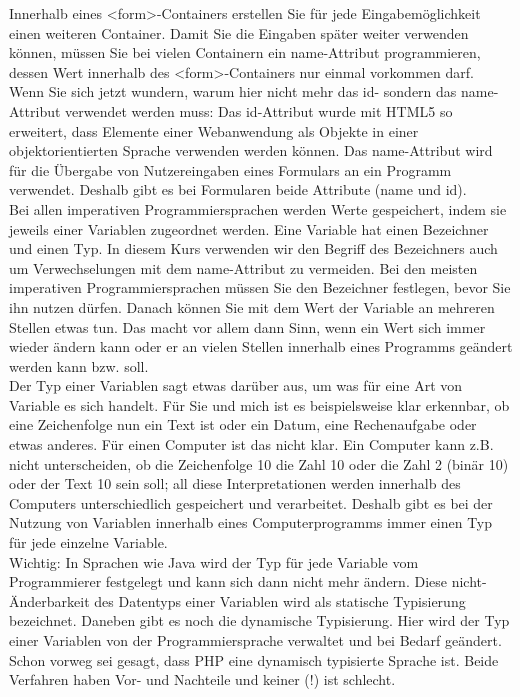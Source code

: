 Innerhalb eines <form>-Containers erstellen Sie für jede Eingabemöglichkeit einen weiteren Container. Damit Sie die Eingaben später weiter verwenden können, müssen Sie bei vielen Containern ein name-Attribut programmieren, dessen Wert innerhalb des <form>-Containers nur einmal vorkommen darf. \\

Wenn Sie sich jetzt wundern, warum hier nicht mehr das id- sondern das name-Attribut verwendet werden muss: Das id-Attribut wurde mit HTML5 so erweitert, dass Elemente einer Webanwendung als Objekte in einer objektorientierten Sprache verwenden werden können. Das name-Attribut wird für die Übergabe von Nutzereingaben eines Formulars an ein Programm verwendet. Deshalb gibt es bei Formularen beide Attribute (name und id).\\

Bei allen imperativen Programmiersprachen werden Werte gespeichert, indem sie jeweils einer Variablen zugeordnet werden. Eine Variable hat einen Bezeichner und einen Typ. In diesem Kurs verwenden wir den Begriff des Bezeichners auch um Verwechselungen mit dem name-Attribut zu vermeiden. Bei den meisten imperativen Programmiersprachen müssen Sie den Bezeichner festlegen, bevor Sie ihn nutzen dürfen. Danach können Sie mit dem Wert der Variable an mehreren Stellen etwas tun. Das macht vor allem dann Sinn, wenn ein Wert sich immer wieder ändern kann oder er an vielen Stellen innerhalb eines Programms geändert werden kann bzw. soll. \\

Der Typ einer Variablen sagt etwas darüber aus, um was für eine Art von Variable es sich handelt. Für Sie und mich ist es beispielsweise klar erkennbar, ob eine Zeichenfolge nun ein Text ist oder ein Datum, eine Rechenaufgabe oder etwas anderes. Für einen Computer ist das nicht klar. Ein Computer kann z.B. nicht unterscheiden, ob die Zeichenfolge 10 die Zahl 10 oder die Zahl 2 (binär 10) oder der Text 10 sein soll; all diese Interpretationen werden innerhalb des Computers unterschiedlich gespeichert und verarbeitet. Deshalb gibt es bei der Nutzung von Variablen innerhalb eines Computerprogramms immer einen Typ für jede einzelne Variable.\\

Wichtig: In Sprachen wie Java wird der Typ für jede Variable vom Programmierer festgelegt und kann sich dann nicht mehr ändern. Diese nicht-Änderbarkeit des Datentyps einer Variablen wird als statische Typisierung bezeichnet. Daneben gibt es noch die dynamische Typisierung. Hier wird der Typ einer Variablen von der Programmiersprache verwaltet und bei Bedarf geändert. Schon vorweg sei gesagt, dass PHP eine dynamisch typisierte Sprache ist. Beide Verfahren haben Vor- und Nachteile und keiner (!) ist schlecht.

